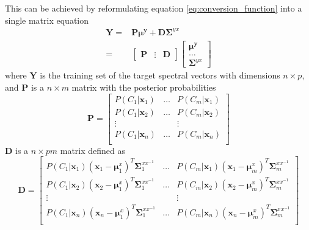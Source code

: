 This can be achieved by reformulating equation \eqref{eq:conversion_function} into a single matrix equation
\begin{equation}
	\label{eq:least_square_problem}
	\begin{split}
		\mathbf{Y} = &\mathbf{P}\boldsymbol{\mu^y} + \mathbf{D}\mathbf{\Sigma}^{yx} \\
		= & \begin{bmatrix}
			\mathbf{P}& \vdots &\mathbf{D}
		\end{bmatrix}
		\begin{bmatrix}
			\boldsymbol{\mu^y} \\
			\dots \\
			\mathbf{\Sigma}^{yx}
		\end{bmatrix}
	\end{split}
\end{equation}
where $\mathbf{Y}$ is the training set of the target spectral vectors with dimensions $n\times p$, and $\mathbf{P}$ is a $n \times m$ matrix with the posterior probabilities
\begin{equation}
	\label{eq:P_matrix}
	\mathbf{P} = \begin{bmatrix}
		P(C_1\vert \mathbf{x}_1) & \dots & P(C_m\vert \mathbf{x}_1) \\
		P(C_1\vert \mathbf{x}_2) & \dots & P(C_m\vert \mathbf{x}_2) \\
		\vdots & & \vdots \\
		P(C_1\vert \mathbf{x}_n) & \dots & P(C_m\vert \mathbf{x}_n) \\
	\end{bmatrix}
\end{equation}
$\mathbf{D}$ is a $n \times pm$ matrix defined as
\begin{equation}
	\label{eq:D_matrix}
	\mathbf{D} = \begin{bmatrix}
		P(C_1\vert \mathbf{x}_1)(\mathbf{x}_1 - \boldsymbol{\mu}_1^x)^T\mathbf{\Sigma}_1^{xx^{-1}} & \dots & P(C_m\vert \mathbf{x}_1)(\mathbf{x}_1 - \boldsymbol{\mu}_m^x)^T\mathbf{\Sigma}_m^{xx^{-1}} \\
		P(C_1\vert \mathbf{x}_2)(\mathbf{x}_2 - \boldsymbol{\mu}_1^x)^T\mathbf{\Sigma}_1^{xx^{-1}} & \dots & P(C_m\vert \mathbf{x}_2)(\mathbf{x}_2 - \boldsymbol{\mu}_m^x)^T\mathbf{\Sigma}_m^{xx^{-1}} \\
		\vdots & & \vdots \\
		P(C_1\vert \mathbf{x}_n)(\mathbf{x}_n - \boldsymbol{\mu}_1^x)^T\mathbf{\Sigma}_1^{xx^{-1}} & \dots & P(C_m\vert \mathbf{x}_n)(\mathbf{x}_n - \boldsymbol{\mu}_m^x)^T\mathbf{\Sigma}_m^{xx^{-1}} \\
	\end{bmatrix}
\end{equation}

